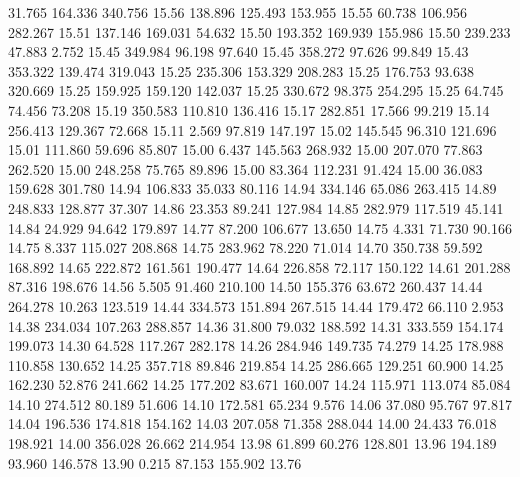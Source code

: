   31.765  164.336  340.756        15.56
 138.896  125.493  153.955        15.55
  60.738  106.956  282.267        15.51
 137.146  169.031   54.632        15.50
 193.352  169.939  155.986        15.50
 239.233   47.883    2.752        15.45
 349.984   96.198   97.640        15.45
 358.272   97.626   99.849        15.43
 353.322  139.474  319.043        15.25
 235.306  153.329  208.283        15.25
 176.753   93.638  320.669        15.25
 159.925  159.120  142.037        15.25
 330.672   98.375  254.295        15.25
  64.745   74.456   73.208        15.19
 350.583  110.810  136.416        15.17
 282.851   17.566   99.219        15.14
 256.413  129.367   72.668        15.11
   2.569   97.819  147.197        15.02
 145.545   96.310  121.696        15.01
 111.860   59.696   85.807        15.00
   6.437  145.563  268.932        15.00
 207.070   77.863  262.520        15.00
 248.258   75.765   89.896        15.00
  83.364  112.231   91.424        15.00
  36.083  159.628  301.780        14.94
 106.833   35.033   80.116        14.94
 334.146   65.086  263.415        14.89
 248.833  128.877   37.307        14.86
  23.353   89.241  127.984        14.85
 282.979  117.519   45.141        14.84
  24.929   94.642  179.897        14.77
  87.200  106.677   13.650        14.75
   4.331   71.730   90.166        14.75
   8.337  115.027  208.868        14.75
 283.962   78.220   71.014        14.70
 350.738   59.592  168.892        14.65
 222.872  161.561  190.477        14.64
 226.858   72.117  150.122        14.61
 201.288   87.316  198.676        14.56
   5.505   91.460  210.100        14.50
 155.376   63.672  260.437        14.44
 264.278   10.263  123.519        14.44
 334.573  151.894  267.515        14.44
 179.472   66.110    2.953        14.38
 234.034  107.263  288.857        14.36
  31.800   79.032  188.592        14.31
 333.559  154.174  199.073        14.30
  64.528  117.267  282.178        14.26
 284.946  149.735   74.279        14.25
 178.988  110.858  130.652        14.25
 357.718   89.846  219.854        14.25
 286.665  129.251   60.900        14.25
 162.230   52.876  241.662        14.25
 177.202   83.671  160.007        14.24
 115.971  113.074   85.084        14.10
 274.512   80.189   51.606        14.10
 172.581   65.234    9.576        14.06
  37.080   95.767   97.817        14.04
 196.536  174.818  154.162        14.03
 207.058   71.358  288.044        14.00
  24.433   76.018  198.921        14.00
 356.028   26.662  214.954        13.98
  61.899   60.276  128.801        13.96
 194.189   93.960  146.578        13.90
   0.215   87.153  155.902        13.76
